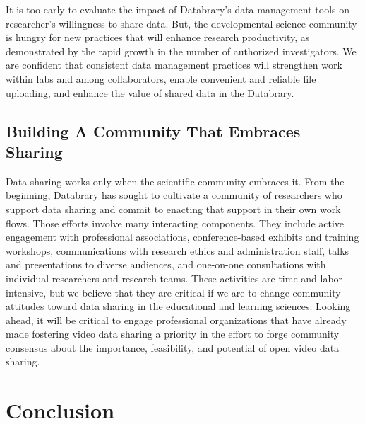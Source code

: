 \documentclass[letterpaper,man,apacite]{apa6}
\begin{document}
It is too early to evaluate the impact of Databrary's data management tools on researcher's willingness to share data.
But, the developmental science community is hungry for new practices that will enhance research productivity, as demonstrated by the rapid growth in the number of authorized investigators.
We are confident that consistent data management practices will strengthen work within labs and among collaborators, enable convenient and reliable file uploading, and enhance the value of shared data in the Databrary.

\subsection{Building A Community That Embraces Sharing}

Data sharing works only when the scientific community embraces it.
From the beginning, Databrary has sought to cultivate a community of researchers who support data sharing and commit to enacting that support in their own work flows.
Those efforts involve many interacting components.
They include active engagement with professional associations, conference-based exhibits and training workshops, communications with research ethics and administration staff, talks and presentations to diverse audiences, and one-on-one consultations with individual researchers and research teams.
These activities are time and labor-intensive, but we believe that they are critical if we are to change community attitudes toward data sharing in the educational and learning sciences.
Looking ahead, it will be critical to engage professional organizations that have already made fostering video data sharing a priority in the effort to forge community consensus about the importance, feasibility, and potential of open video data sharing.

\section{Conclusion}
\end{document}
